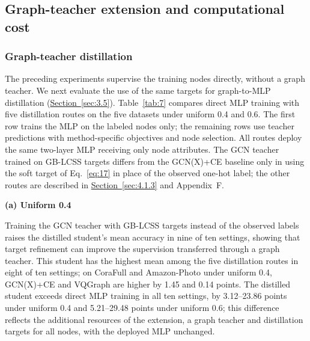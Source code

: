 \documentclass[10pt,letterpaper,nopreprintline]{elsarticle}
\theoremstyle{plain}
\begin{document}
\subsection{Graph-teacher extension and computational cost}\label{sec:4.4}

\subsubsection{Graph-teacher distillation}\label{sec:4.4.1}

The preceding experiments supervise the training nodes directly, without a graph teacher. We next evaluate the use of the same targets for graph-to-MLP distillation (\hyperref[sec:3.5]{Section~\ref*{sec:3.5}}). Table~\ref{tab:7} compares direct MLP training with five distillation routes on the five datasets under uniform 0.4 and 0.6. The first row trains the MLP on the labeled nodes only; the remaining rows use teacher predictions with method-specific objectives and node selection. All routes deploy the same two-layer MLP receiving only node attributes. The GCN teacher trained on GB-LCSS targets differs from the GCN(X)+CE baseline only in using the soft target of Eq.~\eqref{eq:17} in place of the observed one-hot label; the other routes are described in \hyperref[sec:4.1.3]{Section~\ref*{sec:4.1.3}} and Appendix~F.

\begin{table}[!htb]
\centering
\caption{Direct MLP training and graph-to-MLP distillation under uniform noise.}\label{tab:7}
{\small\textbf{(a) Uniform 0.4}}\par\smallskip



\par{}\par\smallskip



\end{table}

Training the GCN teacher with GB-LCSS targets instead of the observed labels raises the distilled student's mean accuracy in nine of ten settings, showing that target refinement can improve the supervision transferred through a graph teacher. This student has the highest mean among the five distillation routes in eight of ten settings; on CoraFull and Amazon-Photo under uniform 0.4, GCN(X)+CE and VQGraph are higher by 1.45 and 0.14 points. The distilled student exceeds direct MLP training in all ten settings, by 3.12--23.86 points under uniform 0.4 and 5.21--29.48 points under uniform 0.6; this difference reflects the additional resources of the extension, a graph teacher and distillation targets for all nodes, with the deployed MLP unchanged.
\end{document}
